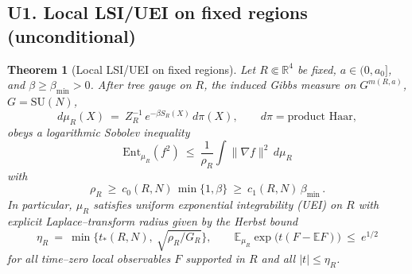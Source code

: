 \documentclass[11pt]{amsart}
\theoremstyle{plain}
\newtheorem{theorem}{Theorem}[section]
\theoremstyle{definition}
\theoremstyle{remark}
\begin{document}
\subsection{U1. Local LSI/UEI on fixed regions (unconditional)}
\begin{theorem}[Local LSI/UEI on fixed regions]\label{thm:U1-lsi-uei}
Let $R\Subset\mathbb R^4$ be fixed, $a\in(0,a_0]$, and $\beta\ge \beta_{\min}>0$. After tree gauge on $R$, the induced Gibbs measure on $G^{m(R,a)}$, $G=\mathrm{SU}(N)$,
\[
  d\mu_R(X)\ =\ Z_R^{-1}\,e^{-\beta S_R(X)}\,d\pi(X),\qquad d\pi=\text{product Haar},
\]
obeys a logarithmic Sobolev inequality
\[
  \mathrm{Ent}_{\mu_R}(f^2)\ \le\ \frac{1}{\rho_R}\int \|\nabla f\|^2\,d\mu_R
\]
with
\[
  \rho_R\ \ge\ c_0(R,N)\,\min\{1,\beta\}\ \ge\ c_1(R,N)\,\beta_{\min}\,.
\]
In particular, $\mu_R$ satisfies uniform exponential integrability (UEI) on $R$ with explicit Laplace–transform radius given by the Herbst bound
\[
  \eta_R\ =\ \min\Big\{t_*(R,N),\ \sqrt{\rho_R/G_R}\Big\},\qquad \mathbb E_{\mu_R}\exp\big(t(F-\mathbb E F)\big)\ \le\ e^{1/2}
\]
for all time–zero local observables $F$ supported in $R$ and all $|t|\le \eta_R$.
\end{theorem}
\end{document}
